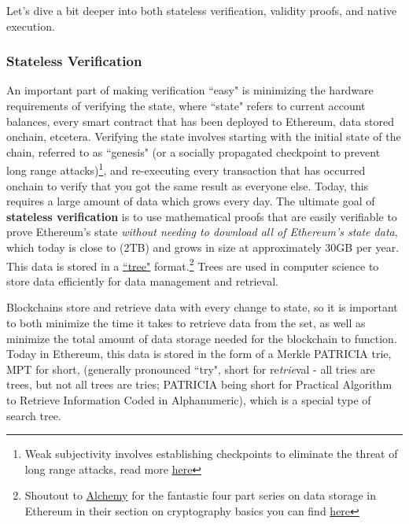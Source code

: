 \documentclass[12pt]{article}
\begin{document}
Let's dive a bit deeper into both stateless verification, validity proofs, and native execution.  

\subsubsection{Stateless Verification}
\label{Stateless Verification}

An important part of making verification ``easy" is minimizing the hardware requirements of verifying the state, where ``state" refers to current account balances, every smart contract that has been deployed to Ethereum, data stored onchain, etcetera. Verifying the state involves starting with the initial state of the chain, referred to as ``genesis" (or a socially propagated checkpoint to prevent long range attacks)\footnote{Weak subjectivity involves establishing checkpoints to eliminate the threat of long range attacks, read more \href{https://ethereum.org/en/developers/docs/consensus-mechanisms/pos/weak-subjectivity/}{here}}, and re-executing every transaction that has occurred onchain to verify that you got the same result as everyone else. Today, this requires a large amount of data which grows every day. The ultimate goal of \textbf{stateless verification} is to use mathematical proofs that are easily verifiable to prove Ethereum's state \textit{without needing to download all of Ethereum's state data}, which today is close to (2TB) and grows in size at approximately 30GB per year. This data is stored in a \href{https://www.alchemy.com/docs/tree-data-structures}{``tree"} format.\footnote{Shoutout to \href{https://x.com/Alchemy}{Alchemy} for the fantastic four part series on data storage in Ethereum in their section on cryptography basics you can find \href{https://www.alchemy.com/docs/tree-data-structures}{here}} Trees are used in computer science to store data efficiently for data management and retrieval. 

Blockchains store and retrieve data with every change to state, so it is important to both minimize the time it takes to retrieve data from the set, as well as minimize the total amount of data storage needed for the blockchain to function. Today in Ethereum, this data is stored in the form of a Merkle PATRICIA trie, MPT for short, (generally pronounced ``try", short for re\textit{trie}val - all tries are trees, but not all trees are tries; 
 PATRICIA being short for Practical Algorithm to Retrieve Information Coded in Alphanumeric), which is a special type of search tree. 
\end{document}
